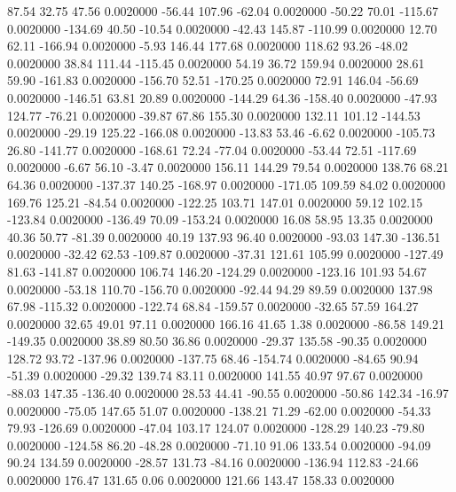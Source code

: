    87.54   32.75   47.56   0.0020000
  -56.44  107.96  -62.04   0.0020000
  -50.22   70.01 -115.67   0.0020000
 -134.69   40.50  -10.54   0.0020000
  -42.43  145.87 -110.99   0.0020000
   12.70   62.11 -166.94   0.0020000
   -5.93  146.44  177.68   0.0020000
  118.62   93.26  -48.02   0.0020000
   38.84  111.44 -115.45   0.0020000
   54.19   36.72  159.94   0.0020000
   28.61   59.90 -161.83   0.0020000
 -156.70   52.51 -170.25   0.0020000
   72.91  146.04  -56.69   0.0020000
 -146.51   63.81   20.89   0.0020000
 -144.29   64.36 -158.40   0.0020000
  -47.93  124.77  -76.21   0.0020000
  -39.87   67.86  155.30   0.0020000
  132.11  101.12 -144.53   0.0020000
  -29.19  125.22 -166.08   0.0020000
  -13.83   53.46   -6.62   0.0020000
 -105.73   26.80 -141.77   0.0020000
 -168.61   72.24  -77.04   0.0020000
  -53.44   72.51 -117.69   0.0020000
   -6.67   56.10   -3.47   0.0020000
  156.11  144.29   79.54   0.0020000
  138.76   68.21   64.36   0.0020000
 -137.37  140.25 -168.97   0.0020000
 -171.05  109.59   84.02   0.0020000
  169.76  125.21  -84.54   0.0020000
 -122.25  103.71  147.01   0.0020000
   59.12  102.15 -123.84   0.0020000
 -136.49   70.09 -153.24   0.0020000
   16.08   58.95   13.35   0.0020000
   40.36   50.77  -81.39   0.0020000
   40.19  137.93   96.40   0.0020000
  -93.03  147.30 -136.51   0.0020000
  -32.42   62.53 -109.87   0.0020000
  -37.31  121.61  105.99   0.0020000
 -127.49   81.63 -141.87   0.0020000
  106.74  146.20 -124.29   0.0020000
 -123.16  101.93   54.67   0.0020000
  -53.18  110.70 -156.70   0.0020000
  -92.44   94.29   89.59   0.0020000
  137.98   67.98 -115.32   0.0020000
 -122.74   68.84 -159.57   0.0020000
  -32.65   57.59  164.27   0.0020000
   32.65   49.01   97.11   0.0020000
  166.16   41.65    1.38   0.0020000
  -86.58  149.21 -149.35   0.0020000
   38.89   80.50   36.86   0.0020000
  -29.37  135.58  -90.35   0.0020000
  128.72   93.72 -137.96   0.0020000
 -137.75   68.46 -154.74   0.0020000
  -84.65   90.94  -51.39   0.0020000
  -29.32  139.74   83.11   0.0020000
  141.55   40.97   97.67   0.0020000
  -88.03  147.35 -136.40   0.0020000
   28.53   44.41  -90.55   0.0020000
  -50.86  142.34  -16.97   0.0020000
  -75.05  147.65   51.07   0.0020000
 -138.21   71.29  -62.00   0.0020000
  -54.33   79.93 -126.69   0.0020000
  -47.04  103.17  124.07   0.0020000
 -128.29  140.23  -79.80   0.0020000
 -124.58   86.20  -48.28   0.0020000
  -71.10   91.06  133.54   0.0020000
  -94.09   90.24  134.59   0.0020000
  -28.57  131.73  -84.16   0.0020000
 -136.94  112.83  -24.66   0.0020000
  176.47  131.65    0.06   0.0020000
  121.66  143.47  158.33   0.0020000
